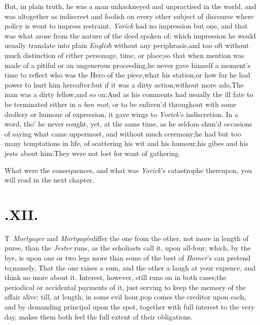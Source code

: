 \documentclass{article}
\begin{document}
But, in plain truth, he was a man unhackneyed and unpractised in
the world, and was altogether as indiscreet and foolish on every
other subject of discourse where policy is wont to impress
restraint. \textit{Yorick} had no impression but one, and that was
what arose from the nature of the deed spoken of; which impression
he would usually translate into plain \textit{English} without any
periphrasis,\tsk  and too oft without much distinction of either
personage, time, or place;\tsk  so that when mention was made of a
pitiful or an ungenerous proceeding,\tsh  he never gave
himself a moment’s time to reflect who was the Hero of the
piece,\tsh  what his station,\tsh  or how far he
had power to hurt him hereafter;\tsk  but if it was a dirty
action,\tsk  without more ado,\tsk  The man was a dirty
fellow,\tsk  and so on:\tsk\break  And as his comments had usually the
ill fate to be terminated either in a \textit{bon mot}, or to be
enliven’d throughout with some drollery or humour of expression, it
gave wings to \textit{Yorick}’s indiscretion. In a word,
tho’ he never sought, yet, at the same time, as he seldom
shun’d occasions of saying what came uppermost, and without much
ceremony;\tsk  he had but too many temptations in life, of
scattering his wit and his humour,\tsk  his gibes and his jests
about him.\tsh  They were not lost for want of
gathering.\\

What were the consequences, and what was \textit{Yorick}’s
catastrophe thereupon, you will read in the next chapter.

\vfill

\section{.\enspace XII.}

\lettrine{T}{\,} \textit{Mortgager} and
\textit{Mortgagée}\break differ the one from the other, not more in length
of purse, than the \textit{Jester} 
runs, as the
scholiasts call it, upon all-four; which, by the bye, is upon one
or two legs more than some of the best of \textit{Homer}’s can
pretend to;\tsk  namely, That the one raises a sum, and the other
a laugh at your expence, and think no more about it. Interest,
however, still runs on in both cases;\tsk  the periodical or
accidental payments of it, just serving to keep the memory of the
affair alive; till, at length, in some evil hour,\tsk pop comes the
creditor upon each, and by demanding principal upon the spot,
together with full interest to the very day, makes them both feel
the full extent of their obligations.
\end{document}
